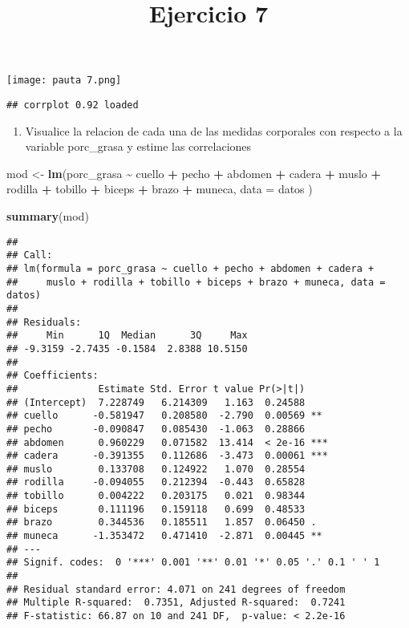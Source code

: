 \documentclass[
]{article}
\title{Ejercicio 7}
\author{}
\date{\vspace{-2.5em}}
\newenvironment{Shaded}{\begin{snugshade}}{\end{snugshade}}
\newcommand{\AttributeTok}[1]{\textcolor[rgb]{0.13,0.29,0.53}{#1}}
\newcommand{\FunctionTok}[1]{\textcolor[rgb]{0.13,0.29,0.53}{\textbf{#1}}}
\newcommand{\NormalTok}[1]{#1}
\newcommand{\OtherTok}[1]{\textcolor[rgb]{0.56,0.35,0.01}{#1}}
\newcommand{\SpecialCharTok}[1]{\textcolor[rgb]{0.81,0.36,0.00}{\textbf{#1}}}
\providecommand{\tightlist}{%
  \setlength{\itemsep}{0pt}\setlength{\parskip}{0pt}}
\begin{document}
\maketitle

\texttt{[image: pauta 7.png]}

\begin{verbatim}
## corrplot 0.92 loaded
\end{verbatim}

\begin{enumerate}
\def\labelenumi{\arabic{enumi}.}
\tightlist
\item
  Visualice la relacion de cada una de las medidas corporales con
  respecto a la variable porc\_grasa y estime las correlaciones
\end{enumerate}

\begin{Shaded}
\begin{Highlighting}[]
\NormalTok{mod }\OtherTok{\textless{}{-}} \FunctionTok{lm}\NormalTok{(porc\_grasa }\SpecialCharTok{\textasciitilde{}}\NormalTok{ cuello }\SpecialCharTok{+}\NormalTok{ pecho }\SpecialCharTok{+}\NormalTok{ abdomen }\SpecialCharTok{+}\NormalTok{ cadera }\SpecialCharTok{+}\NormalTok{ muslo}
          \SpecialCharTok{+}\NormalTok{ rodilla }\SpecialCharTok{+}\NormalTok{ tobillo }\SpecialCharTok{+}\NormalTok{ biceps }\SpecialCharTok{+}\NormalTok{ brazo }\SpecialCharTok{+}\NormalTok{ muneca, }\AttributeTok{data =}\NormalTok{ datos )}

\FunctionTok{summary}\NormalTok{(mod) }
\end{Highlighting}
\end{Shaded}

\begin{verbatim}
## 
## Call:
## lm(formula = porc_grasa ~ cuello + pecho + abdomen + cadera + 
##     muslo + rodilla + tobillo + biceps + brazo + muneca, data = datos)
## 
## Residuals:
##     Min      1Q  Median      3Q     Max 
## -9.3159 -2.7435 -0.1584  2.8388 10.5150 
## 
## Coefficients:
##              Estimate Std. Error t value Pr(>|t|)    
## (Intercept)  7.228749   6.214309   1.163  0.24588    
## cuello      -0.581947   0.208580  -2.790  0.00569 ** 
## pecho       -0.090847   0.085430  -1.063  0.28866    
## abdomen      0.960229   0.071582  13.414  < 2e-16 ***
## cadera      -0.391355   0.112686  -3.473  0.00061 ***
## muslo        0.133708   0.124922   1.070  0.28554    
## rodilla     -0.094055   0.212394  -0.443  0.65828    
## tobillo      0.004222   0.203175   0.021  0.98344    
## biceps       0.111196   0.159118   0.699  0.48533    
## brazo        0.344536   0.185511   1.857  0.06450 .  
## muneca      -1.353472   0.471410  -2.871  0.00445 ** 
## ---
## Signif. codes:  0 '***' 0.001 '**' 0.01 '*' 0.05 '.' 0.1 ' ' 1
## 
## Residual standard error: 4.071 on 241 degrees of freedom
## Multiple R-squared:  0.7351, Adjusted R-squared:  0.7241 
## F-statistic: 66.87 on 10 and 241 DF,  p-value: < 2.2e-16
\end{verbatim}
\end{document}
